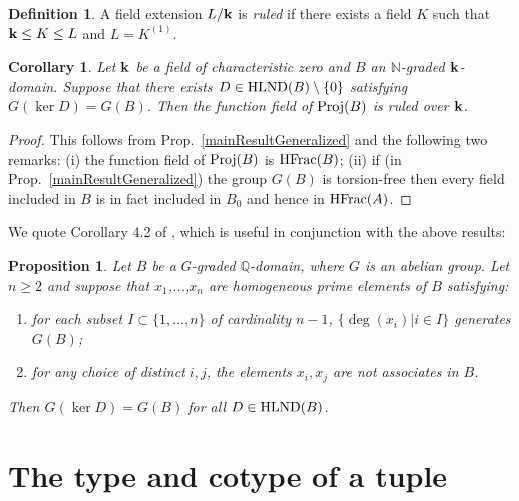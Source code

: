 \documentclass[12pt]{amsart}
\theoremstyle{plain}
\newtheorem{proposition}[subsection]{Proposition}
\newtheorem{corollary}[subsection]{Corollary}
\theoremstyle{definition}
\newtheorem{definition}[subsection]{Definition}
\newcommand{\Proj}{		\operatorname{{\rm Proj}}}
\newcommand{\HFrac}{		\operatorname{{\rm HFrac}}}
\newcommand{\Nat}{\ensuremath{\mathbb{N}}}
\newcommand{\Rat}{\ensuremath{\mathbb{Q}}}
\newcommand{\bk}{{\ensuremath{\rm \bf k}}}
\newcommand{\ggoth}{\mathfrak{g}}
\newcommand{\hlnd}{\operatorname{{\rm HLND}}}
\begin{document}
	\begin{definition}
		A field extension $L / \bk$ is \textit{ruled} if there exists a field $K$ such that $\bk \leq K \leq L$ and $L = K^{(1)}$.  
	\end{definition}
	
	\begin{corollary} \label{mainResult}
		Let $\bk$ be a field of characteristic zero and $B$ an $\Nat$-graded $\bk$-domain.
		Suppose that there exists $D \in \hlnd(B) \setminus \{0\}$ satisfying $G( \ker D ) = G(B)$.
		Then the function field of $\Proj(B)$ is ruled over $\bk$.
	\end{corollary}
	
	\begin{proof}
		This follows from Prop.\ \ref{mainResultGeneralized} and the following two remarks:
		(i) the function field of $\Proj(B)$ is $\HFrac(B)$;
		(ii) if (in Prop.\ \ref{mainResultGeneralized}) the group $G(B)$ is torsion-free then every field included in $B$ is in fact included in $B_0$
		and hence in $\HFrac(A)$.
	\end{proof}
	
	
	We quote Corollary 4.2 of \cite{daigle:hal-01691491}, which is useful in conjunction with the above results:
	
	\begin{proposition} Let $B$ be a $G$-graded $\Rat$-domain, where $G$ is an abelian group.
		Let $n \geq 2$ and suppose that $x_1$,...,$x_n$ are homogeneous prime elements of $B$ satisfying:
		\begin{enumerate}
			
			\item[(i)] for each subset $I \subset \{1,...,n\}$ of cardinality $n - 1$, $\{ \deg(x_i) | i \in I\}$ generates $G(B)$;  
			
			\item[(ii)] for any choice of distinct $i,j$, the elements $x_i, x_j$ are not associates in $B$.
			
		\end{enumerate}
		Then $G(\ker D) = G(B)$ for all $D  \in \hlnd(B)$.
	\end{proposition}
	
	
	\section{The type and cotype of a tuple}
	
	
\end{document}
